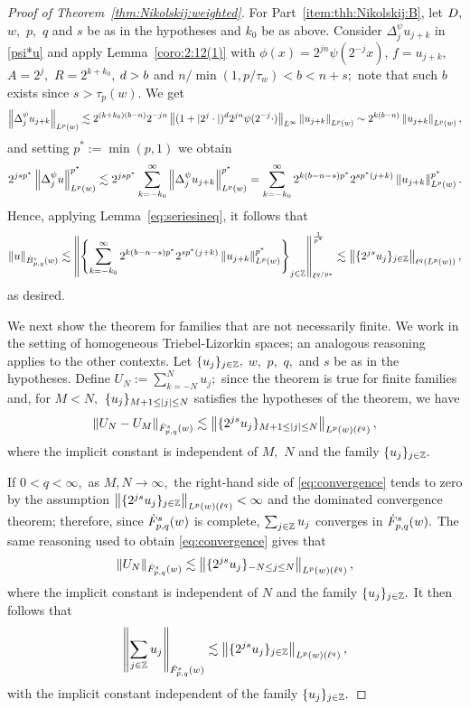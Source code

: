 \begin{proof}[Proof of  Theorem~\ref{thm:Nikolskij:weighted}]
For Part~\eqref{item:thh:Nikolskij:B}, let $\A,$ $w,$ $p,$ $q$ and $s$ be as in the hypotheses and $k_0$ be as above. 
Consider $\Delta^\psi_j  u_{j+k}$  in  \eqref{psi*u} and  apply  Lemma~\ref{coro:2:12(1)}  with $\phi(x)=2^{jn}\psi(2^{-j} x)$, $f= u_{j+k},$ $A=2^{j},$ $R=2^{k +  k_0}$,  $\ex>b$ and $  n /\min(1,p/\tau_w)<b<n+s;$ note that such $b$ exists since $s>\tau_p(w).$ We get
\begin{align*}
 \norm{\Delta^\psi_j  u_{j+k}}{L^p(w)}  \lesssim 2^{(k + k_0)(b-n)} 2^{- j  n} \norm{(1 + |2^j \cdot|)^\ex 2^{jn}\psi(2^{-j}\cdot)}{L^\infty} \norm{u_{j+k}}{L^p(w)}\sim 2^{k(b-n)}   \norm{u_{j+k}}{L^p(w)},
\end{align*}
and setting $p^*:=\min(p,1)$ we obtain
\begin{align*}
2^{js p^*}\norm{\Delta^\psi_j  u}{L^p(w)}^{p^*} \lesssim 2^{js p^*}\sum_{k = - k_0}^\infty \norm{\Delta^\psi_j  u_{j+k}}{L^p(w)}^{p^*}
 =  \sum_{k = - k_0}^\infty 2^{k(b-n -s) p^*} 2^{s p^* (j+k)}   \norm{u_{j+k}}{L^p(w)}^{p^*}.
\end{align*}
Hence, applying Lemma~\ref{eq:seriesineq}, it follows that
\begin{align*}
\norm{u}{\besw{p}{s}{q}{w}}  \lesssim  \norm{\left\{ \sum_{k = - k_0}^\infty 2^{k(b-n -s) p^*}  2^{s p^* (j+k)}   \norm{u_{j+k}}{L^p(w)}^{p^*}\right\}_{j\in\ent}}{\ell^{q/p*}}^\frac{1}{p^*}\lesssim  \norm{\{2^{js} u_j\}_{j\in\ent}}{\ell^{q}(L^p(w))}, 
\end{align*}
as desired.

We next show the theorem for families that are not necessarily finite. We work in the setting of homogeneous Triebel-Lizorkin spaces; an analogous reasoning applies to the other contexts. Let $\{u_j\}_{j\in \ent},$ $w,$ $p,$ $q,$ and $s$ be as in the hypotheses. Define $U_N:=\sum_{k=-N}^N u_j;$  since the theorem is true for finite families and, for $M<N,$ $\{u_j\}_{M+1\le \abs{j}\le N}$ satisfies the hypotheses of the theorem, we have
\begin{equation}\label{eq:convergence}
\norm{U_N-U_M}{\tlw{p}{s}{q}{w}}\lesssim \norm{\{2^{js} u_j\}_{M+1\le \abs{j}\le N}}{\lebw{p}{w}(\ell^q)},
\end{equation}
where the implicit constant is independent of $M,$ $N$ and the family $\{u_j\}_{j\in\ent}.$ 

If $0<q<\infty,$ as $M,N\to\infty,$  the right-hand side of \eqref{eq:convergence} tends to zero by the assumption $\norm{\{2^{js} u_j\}_{j\in \ent}}{\lebw{p}{w}(\ell^q)} <\infty$ and the dominated convergence theorem; therefore, since $\tlw{p}{s}{q}{w}$ is complete, $\sum_{j\in\ent} u_j$ converges in $\tlw{p}{s}{q}{w}.$ The same reasoning used to obtain \eqref{eq:convergence} gives that
\[
\norm{U_N}{\tlw{p}{s}{q}{w}}\lesssim \norm{\{2^{js} u_j\}_{-N\le j\le N}}{\lebw{p}{w}(\ell^q)},
\]
where the implicit constant is independent of $N$ and the family $\{u_j\}_{j\in\ent}.$ It then  follows that
\[
\norm{\sum_{j\in\ent} u_j}{\tlw{p}{s}{q}{w}}\lesssim \norm{\{2^{js} u_j\}_{j\in\ent}}{\lebw{p}{w}(\ell^q)},
\]
with the implicit constant  independent of  the family $\{u_j\}_{j\in\ent}.$



\end{proof}
